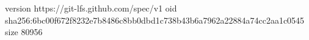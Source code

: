 version https://git-lfs.github.com/spec/v1
oid sha256:6bc00f672f8232e7b8486c8bb0dbd1c738b43b6a7962a22884a74cc2aa1c0545
size 80956
